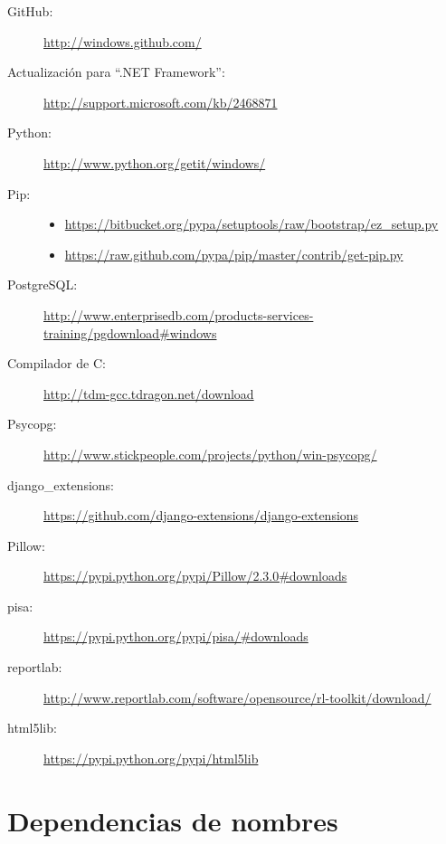 \documentclass[9pt, letterpaper, oneside]{report}
\begin{document}
    \begin{description}
      \item[GitHub:] \url{http://windows.github.com/}

      \item[Actualización para ``.NET Framework'':]
        \url{http://support.microsoft.com/kb/2468871}

      \item[Python:] \url{http://www.python.org/getit/windows/}

      \item[Pip:]
        \begin{itemize}
          \item \url{https://bitbucket.org/pypa/setuptools/raw/bootstrap/ez\_setup.py}
          \item \url{https://raw.github.com/pypa/pip/master/contrib/get-pip.py}
        \end{itemize}

      \item[PostgreSQL:]
        \url{http://www.enterprisedb.com/products-services-training/pgdownload#windows}

      \item[Compilador de C:] \url{http://tdm-gcc.tdragon.net/download}
      
      \item[Psycopg:] \url{http://www.stickpeople.com/projects/python/win-psycopg/}

      \item[django\_extensions:]
        \url{https://github.com/django-extensions/django-extensions}

      \item[Pillow:] \url{https://pypi.python.org/pypi/Pillow/2.3.0#downloads}

      \item[pisa:] \url{https://pypi.python.org/pypi/pisa/#downloads}

      \item[reportlab:]
        \url{http://www.reportlab.com/software/opensource/rl-toolkit/download/}

      \item[html5lib:] \url{https://pypi.python.org/pypi/html5lib}

    \end{description}

  \section{Dependencias de nombres}
\end{document}
